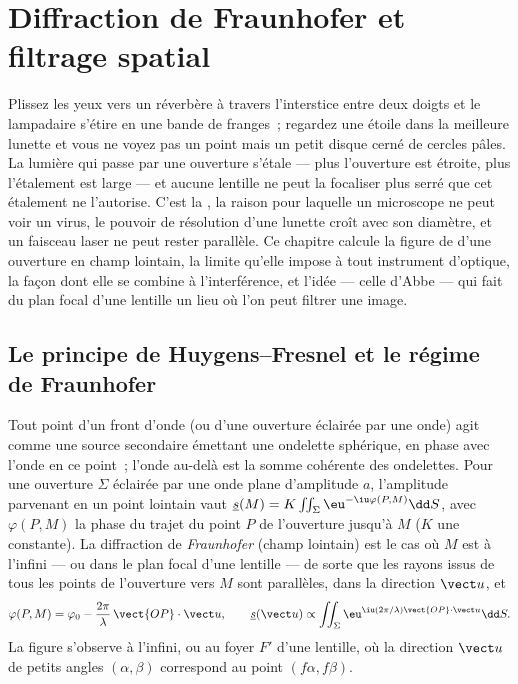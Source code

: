 \chapter{Diffraction de Fraunhofer et filtrage spatial}\label{ch:b2:diffraction}

Plissez les yeux vers un réverbère à travers l'interstice entre deux doigts et le
lampadaire s'étire en une bande de franges~; regardez une étoile dans la
meilleure lunette et vous ne voyez pas un point mais un petit disque cerné de
cercles pâles. La lumière qui passe par une ouverture s'étale --- plus
l'ouverture est étroite, plus l'étalement est large --- et aucune lentille ne peut la focaliser
plus serré que cet étalement ne l'autorise. C'est la \emph{}, la raison pour laquelle
un microscope ne peut voir un virus, le pouvoir de résolution d'une lunette croît
avec son diamètre, et un faisceau laser ne peut rester parallèle. Ce chapitre
calcule la figure de  d'une ouverture en champ lointain, la
limite qu'elle impose à tout instrument d'optique, la façon dont elle se combine à
l'interférence, et l'idée --- celle d'Abbe --- qui fait du plan focal d'une
lentille un lieu où l'on peut filtrer une image.

\section{Le principe de Huygens--Fresnel et le régime de Fraunhofer}

\begin{definition}\label{def:b2:diffraction:huygens}
Tout point d'un front d'onde (ou d'une ouverture éclairée par une onde) agit comme une
source secondaire émettant une ondelette sphérique, en phase avec l'onde
en ce point~; l'onde au-delà est la somme cohérente des ondelettes. Pour une
ouverture $\Sigma$ éclairée par une onde plane d'amplitude $a$, l'amplitude
parvenant en un point lointain vaut $\underline s(M) = K\iint_\Sigma\eu^{-\iu\varphi(P, M)}\dd S$, avec
$\varphi(P, M)$ la phase du trajet du point $P$ de l'ouverture jusqu'à $M$
($K$ une constante). La diffraction de \emph{Fraunhofer} (champ lointain) est le cas
où $M$ est à l'infini --- ou dans le plan focal d'une lentille --- de sorte que
les rayons issus de tous les points de l'ouverture vers $M$ sont parallèles, dans
la direction $\vect u$, et
\[
\varphi(P, M) = \varphi_0 - \frac{2\pi}\lambda\,\vect{OP}\cdot\vect u , \qquad
\underline s(\vect u) \propto \iint_\Sigma\eu^{\iu(2\pi/\lambda)\vect{OP}\cdot\vect u}\dd S .
\]
La figure s'observe à l'infini, ou au foyer $F'$ d'une lentille,
où la direction $\vect u$ de petits angles $(\alpha, \beta)$ correspond au
point $(f\alpha, f\beta)$.
\end{definition}
\admitted

